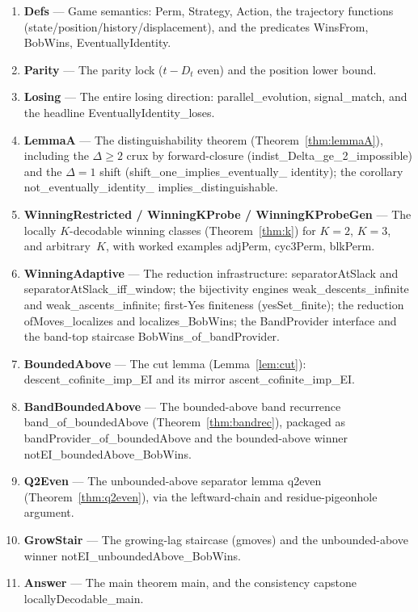 \documentclass{article}
\newcommand{\us}{\discretionary{}{}{}\_\discretionary{}{}{}}
\newcommand{\lean}[1]{{\small\ttfamily #1}}
\begin{document}
\begin{enumerate}[leftmargin=2em,topsep=2pt,itemsep=2pt]
  \item \textbf{\lean{Defs}} --- Game semantics: \lean{Perm},
  \lean{Strategy}, \lean{Action}, the trajectory functions
  (\lean{state}/\lean{position}/\lean{history}/\lean{displacement}), and
  the predicates \lean{WinsFrom}, \lean{BobWins}, \lean{EventuallyIdentity}.
  \item \textbf{\lean{Parity}} --- The parity lock
  ($t-D_t$ even) and the position lower bound.
  \item \textbf{\lean{Losing}} --- The entire losing direction:
  \lean{parallel\us evolution}, \lean{signal\us match}, and the headline
  \lean{EventuallyIdentity\us loses}.
  \item \textbf{\lean{LemmaA}} --- The distinguishability theorem
  (Theorem~\ref{thm:lemmaA}), including the $\Delta\ge2$ crux by
  forward-closure (\lean{indist\us Delta\us ge\us 2\us impossible}) and
  the $\Delta=1$ shift (\lean{shift\us one\us implies\us eventually\us
  identity}); the corollary \lean{not\us eventually\us identity\us
  implies\us distinguishable}.
  \item \textbf{\lean{WinningRestricted} / \lean{WinningKProbe} /
  \lean{WinningKProbeGen}} --- The locally $K$-decodable winning classes
  (Theorem~\ref{thm:k}) for $K{=}2$, $K{=}3$, and arbitrary~$K$, with
  worked examples \lean{adjPerm}, \lean{cyc3Perm}, \lean{blkPerm}.
  \item \textbf{\lean{WinningAdaptive}} --- The reduction infrastructure:
  \lean{separatorAtSlack} and \lean{separatorAtSlack\us iff\us window};
  the bijectivity engines \lean{weak\us descents\us infinite} and
  \lean{weak\us ascents\us infinite}; first-Yes finiteness
  (\lean{yesSet\us finite}); the reduction \lean{ofMoves\us localizes} and
  \lean{localizes\us BobWins}; the \lean{BandProvider} interface and the
  band-top staircase \lean{BobWins\us of\us bandProvider}.
  \item \textbf{\lean{BoundedAbove}} --- The cut lemma
  (Lemma~\ref{lem:cut}): \lean{descent\us cofinite\us imp\us EI} and its
  mirror \lean{ascent\us cofinite\us imp\us EI}.
  \item \textbf{\lean{BandBoundedAbove}} --- The bounded-above band
  recurrence \lean{band\us of\us boundedAbove}
  (Theorem~\ref{thm:bandrec}), packaged as
  \lean{bandProvider\us of\us boundedAbove} and the bounded-above winner
  \lean{notEI\us boundedAbove\us BobWins}.
  \item \textbf{\lean{Q2Even}} --- The unbounded-above separator lemma
  \lean{q2even} (Theorem~\ref{thm:q2even}), via the leftward-chain and
  residue-pigeonhole argument.
  \item \textbf{\lean{GrowStair}} --- The growing-lag staircase
  (\lean{gmoves}) and the unbounded-above winner
  \lean{notEI\us unboundedAbove\us BobWins}.
  \item \textbf{\lean{Answer}} --- The main theorem \lean{main}, and the
  consistency capstone \lean{locallyDecodable\us main}.
\end{enumerate}
\end{document}
